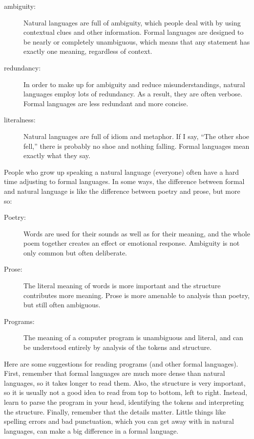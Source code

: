 \begin{description}

\item[ambiguity:] Natural languages are full of ambiguity, which
people deal with by using contextual clues and other information.
Formal languages are designed to be nearly or completely unambiguous,
which means that any statement has exactly one meaning,
regardless of context.

\item[redundancy:] In order to make up for ambiguity and reduce
misunderstandings, natural languages employ lots of
redundancy.  As a result, they are often verbose.  Formal languages
are less redundant and more concise.

\item[literalness:] Natural languages are full of idiom and
metaphor.  If I say, ``The other shoe fell,'' there is probably
no shoe and nothing falling.  Formal languages mean
exactly what they say.

\end{description}

People who grow up speaking a natural language (everyone) often have a
hard time adjusting to formal languages.  In some ways, the difference
between formal and natural language is like the difference between
poetry and prose, but more so:


\begin{description}

\item[Poetry:] Words are used for their sounds as well as for
their meaning, and the whole poem together creates an effect or
emotional response.  Ambiguity is not only common but often
deliberate.

\item[Prose:] The literal meaning of words is more important
and the structure contributes more meaning.  Prose is more amenable to
analysis than poetry, but still often ambiguous.

\item[Programs:] The meaning of a computer program is unambiguous
and literal, and can be understood entirely by analysis of the
tokens and structure.

\end{description}

Here are some suggestions for reading programs (and other formal
languages).  First, remember that formal languages are much more dense
than natural languages, so it takes longer to read them.  Also, the
structure is very important, so it is usually not a good idea to read
from top to bottom, left to right.  Instead, learn to parse the
program in your head, identifying the tokens and interpreting the
structure.  Finally, remember that the details matter.  Little things
like spelling errors and bad punctuation, which you can get away
with in natural languages, can make a big difference in a formal
language.

